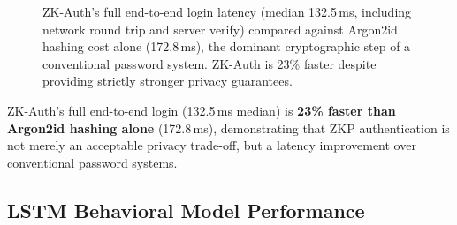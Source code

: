 \documentclass[journal,twoside,10pt]{IEEEtran}
\begin{document}
\begin{table}[!t]
\renewcommand{\arraystretch}{1.2}
\caption{Argon2id Baseline ($n=30$, memoryCost=65{,}536\,KiB, timeCost=3,
parallelism=1).}
\label{tab:argon2}
\centering
{}
\end{table}

\begin{figure}[!t]
\centering
{}
\caption{ZK-Auth's full end-to-end login latency (median 132.5\,ms,
including network round trip and server verify) compared against Argon2id
hashing cost alone (172.8\,ms), the dominant cryptographic step of a
conventional password system. ZK-Auth is 23\% faster despite providing
strictly stronger privacy guarantees.}
\label{fig:argon_compare}
\end{figure}

ZK-Auth's full end-to-end login (132.5\,ms median) is \textbf{23\% faster
than Argon2id hashing alone} (172.8\,ms), demonstrating that ZKP
authentication is not merely an acceptable privacy trade-off, but a latency
improvement over conventional password systems.

\subsection{LSTM Behavioral Model Performance}
\end{document}
